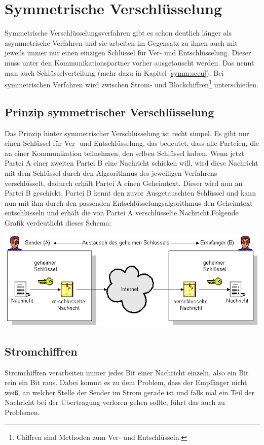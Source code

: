 \documentclass[a4paper,12pt,titlepage]{article}
\begin{document}
\section{Symmetrische Verschlüsselung}\label{symm}
Symmetrische Verschlüsselungsverfahren gibt es schon deutlich länger als asymmetrische Verfahren und sie arbeiten im Gegensatz zu ihnen auch mit jeweils immer nur einen einzigen Schlüssel für Ver- und Entschlüsselung. Dieser muss unter den Kommunikationspartner vorher ausgetauscht werden. Das nennt man auch Schlüsselverteilung (mehr dazu in Kapitel \ref{symm:secu}). \newline Bei symmetrischen Verfahren wird zwischen Strom- und Blockchiffren\footnote{Chiffren sind Methoden zum Ver- und Entschlüsseln.} unterschieden. %

\subsection{Prinzip symmetrischer Verschlüsselung}
Das Prinzip hinter symmetrischer Verschlüsselung ist recht simpel. Es gibt nur einen Schlüssel für Ver- und Entschlüsselung, das bedeutet, dass alle Parteien, die an einer Kommunikation teilnehmen, den selben Schlüssel haben. Wenn jetzt Partei A einer zweiten Partei B eine Nachricht schicken will, wird diese Nachricht mit dem Schlüssel durch den Algrorithmus des jeweiligen Verfahrens verschlüsselt, dadurch erhält Partei A einen Geheimtext. Dieser wird nun an Partei B geschickt. Partei B kennt den zuvor Ausgetauschten Schlüssel und kann nun mit ihm durch den passenden Entschlüsselungsalgorithmus den Geheimtext entschlüsseln und erhält die von Partei A verschlüsselte Nachricht.\newline Folgende Grafik verdeutlicht dieses Schema:

\begin{center}
\includegraphics[scale=0.7]{symm_shema.png} %
\end{center}

\subsection{Stromchiffren}
Stromchiffren verarbeiten immer jedes Bit einer Nachricht einzeln, also ein Bit rein ein Bit raus. Dabei kommt es zu dem Problem, dass der Empfänger nicht weiß, an welcher Stelle der Sender im Strom gerade ist und falls mal ein Teil der Nachricht bei der Übertragung verloren gehen sollte, führt das auch zu Problemen.
\end{document}
